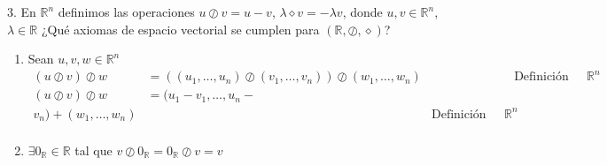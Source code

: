 \documentclass[20pt]{report}
\newcommand{\+}{\oslash}
\renewcommand{\*}{\diamond}
\newcommand{\R}{\mathds{R}}
\theoremstyle{definition}
\begin{document}
	
	3. En $ \R^n $ definimos las operaciones $ u\+ v = u - v$, $ \lambda \* v = -\lambda v $, donde $ u,v \in \R^n $, $ \lambda \in \R $
	¿Qué axiomas de espacio vectorial se cumplen para $ (\R, \+, \*) $? 
	
	\begin{enumerate}
		\item Sean $ u,v,w \in \R^n $
		\begin{align*}
			(u \+ v) \+ w &= ((u_1, \dots, u_n) \+ (v_1, \dots, v_n)) \+ (w_1, \dots, w_n) &&\text{Definición porque están en }\R^n\\
			(u \+ v) \+ w &= (u_1 - v_1, \dots, u_n -\\
			 v_n) + (w_1, \dots, w_n) &&\text{Definición porque están en }\R^n\\
		\end{align*}
		\item $ \exists 0_\R \in \R $ tal que $ v \+ 0_\R = 0_\R \+ v = v $
	\end{enumerate}
\end{document}
